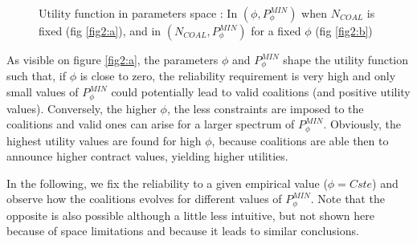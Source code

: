 \documentclass[conference]{IEEEtran}
\begin{document}
\begin{figure}
 \centering
  \hspace{1em}%
\caption{Utility function in parameters space : In $ (\phi, P_{\phi}^{MIN}) $ when $ N_{COAL} $ is fixed (fig \ref{fig2:a}), and in $ (N_{COAL}, P_{\phi}^{MIN}) $ for a fixed $ \phi $ (fig \ref{fig2:b})}
\label{Fig2}
\end{figure}

As visible on figure \ref{fig2:a}, the parameters $\phi$ and $P_{\phi}^{MIN}$ shape the utility function such that, if $ \phi $ is close to zero, the reliability requirement is very high and only small values of $ P_{\phi}^{MIN}$ could potentially lead to valid coalitions (and positive utility values). Conversely, the higher $\phi$, the less constraints are imposed to the coalitions and valid ones can arise for a larger spectrum of $ P_{\phi}^{MIN}$. Obviously, the highest utility values are found for high $ \phi $, because coalitions are able then to announce higher contract values, yielding higher utilities. 

In the following, we fix the reliability to a given empirical value ($\phi = Cste $) and observe how the coalitions evolves for different values of $P_{\phi}^{MIN}$. Note that the opposite is also possible although a little less intuitive, but not shown here because of space limitations and because it leads to similar conclusions. 
\end{document}
